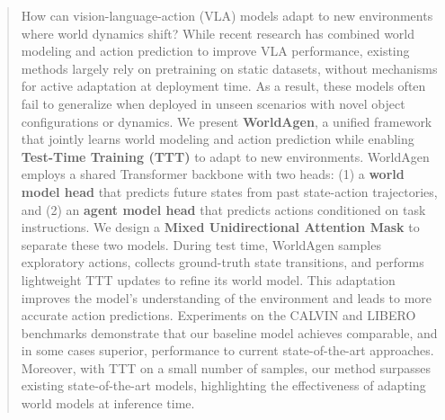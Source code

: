 \begin{abstract}
How can vision-language-action (VLA) models adapt to new environments where world dynamics shift? While recent research has combined world modeling and action prediction to improve VLA performance, existing methods largely rely on pretraining on static datasets, without mechanisms for active adaptation at deployment time. As a result, these models often fail to generalize when deployed in unseen scenarios with novel object configurations or dynamics.
We present \textbf{WorldAgen}, a unified framework that jointly learns world modeling and action prediction while enabling \textbf{Test-Time Training (TTT)} to adapt to new environments. WorldAgen employs a shared Transformer backbone with two heads: (1) a \textbf{world model head} that predicts future states from past state-action trajectories, and (2) an \textbf{agent model head} that predicts actions conditioned on task instructions. We design a \textbf{Mixed Unidirectional Attention Mask} to separate these two models. During test time, WorldAgen samples exploratory actions, collects ground-truth state transitions, and performs lightweight TTT updates to refine its world model. This adaptation improves the model's understanding of the environment and leads to more accurate action predictions.
Experiments on the CALVIN and LIBERO benchmarks demonstrate that our baseline model achieves comparable, and in some cases superior, performance to current state-of-the-art approaches. Moreover, with TTT on a small number of samples, our method surpasses existing state-of-the-art models, highlighting the effectiveness of adapting world models at inference time.
\end{abstract}
